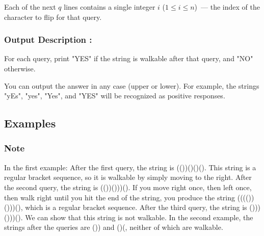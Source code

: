 \documentclass{article}
\begin{document}
Each of the next $q$ lines contains a single integer $i$ ($1\le i \le n$) — the index of the character to flip for that query.
\paragraph{}
\subsubsection*{Output Description : }For each query, print "YES" if the string is walkable after that query, and "NO" otherwise.

You can output the answer in any case (upper or lower). For example, the strings "yEs", "yes", "Yes", and "YES" will be recognized as positive responses.
\subsection*{Examples}
\subsubsection*{Note}In the first example:   After the first query, the string is (())()()(). This string is a regular bracket sequence, so it is walkable by simply moving to the right.  After the second query, the string is (())()))(). If you move right once, then left once, then walk right until you hit the end of the string, you produce the string (((())()))(), which is a regular bracket sequence.  After the third query, the string is ()))()))(). We can show that this string is not walkable.  In the second example, the strings after the queries are ()) and ()(, neither of which are walkable.
\newpage
\end{document}
